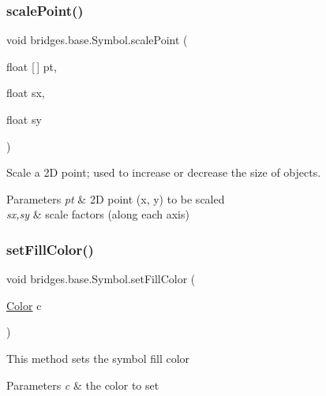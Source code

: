 \subsubsection{\texorpdfstring{scale\+Point()}{scalePoint()}}
{\footnotesize\ttfamily void bridges.\+base.\+Symbol.\+scale\+Point (\begin{DoxyParamCaption}\item[{float \mbox{[}$\,$\mbox{]}}]{pt,  }\item[{float}]{sx,  }\item[{float}]{sy }\end{DoxyParamCaption})\hspace{0.3cm}{\ttfamily [protected]}}



Scale a 2D point; used to increase or decrease the size of objects. 


\begin{DoxyParams}{Parameters}
{\em pt} & 2D point (x, y) to be scaled \\
\hline
{\em sx,sy} & scale factors (along each axis) \\
\hline
\end{DoxyParams}
\mbox{\label{classbridges_1_1base_1_1_symbol_a850688e5157674aee916fef6cd9e0b8c}} 
\subsubsection{\texorpdfstring{set\+Fill\+Color()}{setFillColor()}\hspace{0.1cm}{\footnotesize\ttfamily [1/2]}}
{\footnotesize\ttfamily void bridges.\+base.\+Symbol.\+set\+Fill\+Color (\begin{DoxyParamCaption}\item[{\hyperlink{classbridges_1_1base_1_1_color}{Color}}]{c }\end{DoxyParamCaption})}

This method sets the symbol fill color


\begin{DoxyParams}{Parameters}
{\em c} & the color to set \\
\hline
\end{DoxyParams}
\mbox{\label{classbridges_1_1base_1_1_symbol_a3a2c48d9707ff3fa7a832e77b679b1b9}} 
